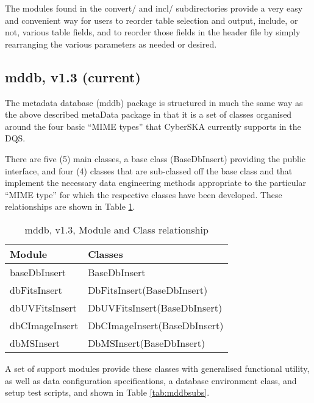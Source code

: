 The modules found in the convert/ and incl/ subdirectories provide a very
easy and convenient way for users to reorder table selection and output, include, or not, 
various table fields, and to reorder those fields in the header file by simply rearranging
the various parameters as needed or desired.

\subsection{mddb, v1.3 (current)}
\label{sec:mddb}
The metadata database (mddb) package is structured in much the same
way as the above described metaData package in that it is a set of classes
organised around the four basic ``MIME types'' that CyberSKA currently
supports in the DQS.

There are five (5) main classes, a base class (BaseDbInsert)
providing the public interface, and four (4) classes that are
sub-classed off the base class and that implement the
necessary data engineering methods appropriate to the particular
``MIME type'' for which the respective classes have been
developed. These relationships are shown in Table \ref{tab:mddbmods}.

\begin{table}[htbp]
  \centering
  \begin{tabular}{|l|p{8.0cm}|} 
    \hline
    \sc \textbf{Module} & \textbf{Classes} \\
    \hline
    baseDbInsert & BaseDbInsert \\
    dbFitsInsert   & DbFitsInsert(BaseDbInsert) \\
    dbUVFitsInsert& DbUVFitsInsert(BaseDbInsert)\\
    dbCImageInsert& DbCImageInsert(BaseDbInsert)\\
    dbMSInsert & DbMSInsert(BaseDbInsert)\\
    \hline
  \end{tabular}
  \caption{mddb, v1.3, Module and Class relationship}
  \label{tab:mddbmods}
\end{table}

A set of support modules provide these classes with generalised
functional utility, as well as data configuration specifications, a
database environment class, and setup test scripts, and shown in Table \ref{tab:mddbsubs}.

